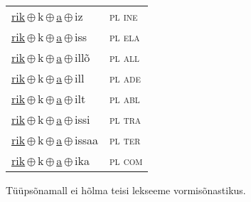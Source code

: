 \begin{minipage}{\textwidth}
\begin{sideways}
\begin{tabular}{l l}
\underline{rik}\,$\oplus$\,k\,$\oplus$\,\underline{a}\,$\oplus$\,iz & \textsc{ pl ine } \\
\underline{rik}\,$\oplus$\,k\,$\oplus$\,\underline{a}\,$\oplus$\,iss & \textsc{ pl ela } \\
\underline{rik}\,$\oplus$\,k\,$\oplus$\,\underline{a}\,$\oplus$\,illõ & \textsc{ pl all } \\
\underline{rik}\,$\oplus$\,k\,$\oplus$\,\underline{a}\,$\oplus$\,ill & \textsc{ pl ade } \\
\underline{rik}\,$\oplus$\,k\,$\oplus$\,\underline{a}\,$\oplus$\,ilt & \textsc{ pl abl } \\
\underline{rik}\,$\oplus$\,k\,$\oplus$\,\underline{a}\,$\oplus$\,issi & \textsc{ pl tra } \\
\underline{rik}\,$\oplus$\,k\,$\oplus$\,\underline{a}\,$\oplus$\,issaa & \textsc{ pl ter } \\
\underline{rik}\,$\oplus$\,k\,$\oplus$\,\underline{a}\,$\oplus$\,ika & \textsc{ pl com } \\
\end{tabular}
\end{sideways}
\label{tab:tüüpsõnamall-rikaz}

\end{minipage}

 
\vspace{1em}
\noindent Tüüpsõnamall  ei hõlma teisi lekseeme vormi\-sõnastikus.
